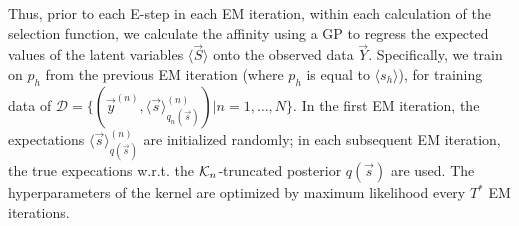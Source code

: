 Thus, prior to each E-step in each EM iteration, within each calculation of the selection function, we calculate the affinity  using a GP to regress the expected values of the latent variables $\langle \vec{S} \rangle$ onto the observed data $\vec{Y}$.  
Specifically, we train on $p_h$ from the previous EM iteration (where $p_h$ is equal to $\langle s_h \rangle$), for 
training data of 
$\mathcal{D} = \{ (\vec{y}^{(n)}, \langle\vec{s}\rangle^{(n)}_{q_n(\vec{s})}) | n = 1,\dots, N \}$.
%
In the first EM iteration, the expectations $\langle\vec{s}\rangle^{(n)}_{q(\vec{s})}$ are initialized randomly;
in each subsequent EM iteration, the true expecations w.r.t. the $\mathcal{K}_{n}$-truncated posterior $q(\vec{s})$ are used. 
The hyperparameters of the kernel are optimized by maximum likelihood every $T^*$ EM iterations.

